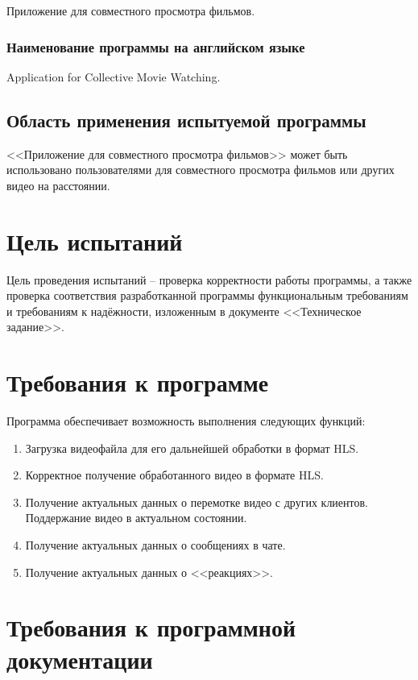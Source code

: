 \documentclass{../includes/TechDocMultiAuthors}
\begin{document}
    Приложение для совместного просмотра фильмов.

    \subsubsection{Наименование программы на английском языке}

    Application for Collective Movie Watching.

    \subsection{Область применения испытуемой программы}

    <<Приложение для совместного просмотра фильмов>> может быть использовано пользователями для совместного просмотра фильмов или других видео на расстоянии.

    \section{Цель испытаний}

    Цель проведения испытаний -- проверка корректности работы программы, а также проверка соответствия разработканной программы функциональным требованиям и требованиям к надёжности, изложенным в документе <<Техническое задание>>.

    \section{Требования к программе}

    Программа обеспечивает возможность выполнения следующих функций:
    \begin{enumerate}
        \item Загрузка видеофайла для его дальнейшей обработки в формат HLS.
        \item Корректное получение обработанного видео в формате HLS.
        \item Получение актуальных данных о перемотке видео с других клиентов.
        Поддержание видео в актуальном состоянии.
        \item Получение актуальных данных о сообщениях в чате.
        \item Получение актуальных данных о <<реакциях>>.
    \end{enumerate}

    \section{Требования к программной документации}
\end{document}

